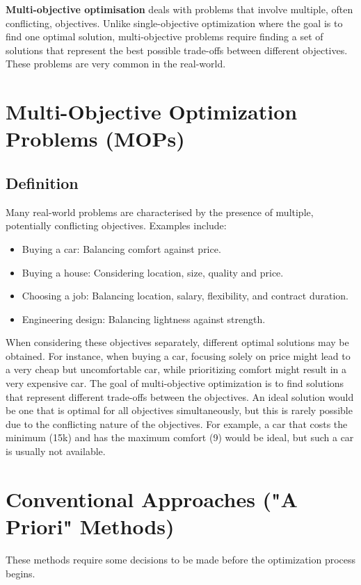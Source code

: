 \textbf{Multi-objective optimisation} deals with problems that involve multiple, often conflicting, objectives.  Unlike single-objective optimization where the goal is to find one optimal solution, multi-objective problems require finding a set of solutions that represent the best possible trade-offs between different objectives.  These problems are very common in the real-world.

\section{Multi-Objective Optimization Problems (MOPs)}

\subsection*{Definition}

Many real-world problems are characterised by the presence of multiple, potentially conflicting objectives. Examples include:

\begin{itemize}
    \item Buying a car: Balancing comfort against price.
    \item Buying a house: Considering location, size, quality and price.
    \item Choosing a job: Balancing location, salary, flexibility, and contract duration.
    \item Engineering design: Balancing lightness against strength.
\end{itemize}
When considering these objectives separately, different optimal solutions may be obtained. For instance, when buying a car, focusing solely on price might lead to a very cheap but uncomfortable car, while prioritizing comfort might result in a very expensive car.
The goal of multi-objective optimization is to find solutions that represent different trade-offs between the objectives.  An ideal solution would be one that is optimal for all objectives simultaneously, but this is rarely possible due to the conflicting nature of the objectives. For example, a car that costs the minimum (15k) and has the maximum comfort (9) would be ideal, but such a car is usually not available.

\section{Conventional Approaches ("A Priori" Methods)}
These methods require some decisions to be made before the optimization process begins.

